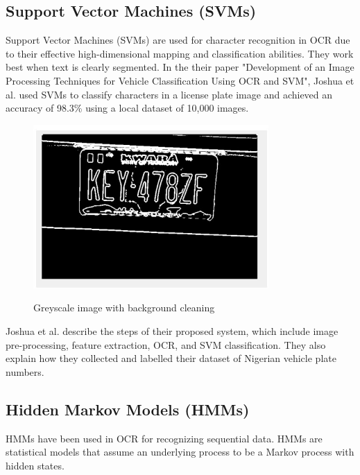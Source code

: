 \newpage

\subsection{Support Vector Machines (SVMs)}

Support Vector Machines (SVMs) are used for character recognition in OCR due to their effective high-dimensional mapping and classification abilities. They work best when text is clearly segmented. In the their paper "Development of an Image Processing Techniques for Vehicle Classification Using OCR and SVM", Joshua et al. used SVMs to classify characters in a license plate image and achieved an accuracy of 98.3\% using a local dataset of 10,000 images.\cite{joshuaDevelopmentImageProcessing2023}

\begin{figure}[ht]
    \centering
    \includegraphics[width=0.8\textwidth]{Figures/SVM_Joshua.jpg}
    \caption[Development of an Image Processing Technique for Vehicle Classification using OCR and SVM]{Greyscale image with background cleaning}\cite{joshuaDevelopmentImageProcessing2023}
    \label{fig:Joshua SVM Paper}
\end{figure}

Joshua et al. describe the steps of their proposed system, which include image pre-processing, feature extraction, OCR, and SVM classification. They also explain how they collected and labelled their dataset of Nigerian vehicle plate numbers.

\newpage

\subsection{Hidden Markov Models (HMMs)}

HMMs have been used in OCR for recognizing sequential data. HMMs are statistical models that assume an underlying process to be a Markov process with hidden states.


